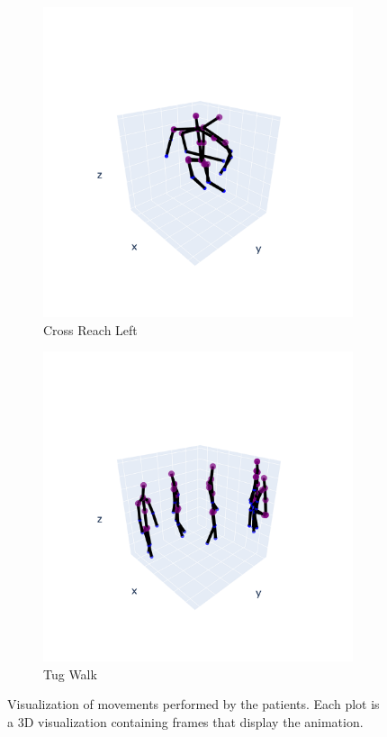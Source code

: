 \begin{figure}[h]
            \begin{subfigure}{.5\textwidth}
                \centering
                \includegraphics[width=.9\linewidth]{../src/resources/plots/movements/mov-2.png}
                \caption{Cross Reach Left}
                \label{fig:mov-2}
            \end{subfigure}
            \begin{subfigure}{.5\textwidth}
                \centering
                \includegraphics[width=.9\linewidth]{../src/resources/plots/movements/mov-9.png}
                \caption{Tug Walk}
                \label{fig:mov-9}
            \end{subfigure}
            
            \caption{Visualization of movements performed by the patients. Each plot is a 3D visualization containing frames that display the animation.}
            \label{fig:movements_visualization}
        \end{figure}

